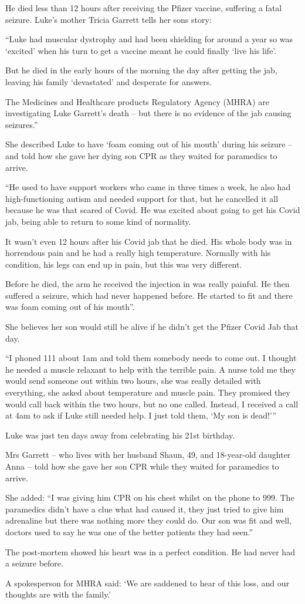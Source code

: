 He died less than 12 hours after receiving the Pfizer vaccine, suffering a fatal
seizure. Luke’s mother Tricia Garrett tells her sons story:

“Luke had muscular dystrophy and had been shielding for around a year so was
‘excited’ when his turn to get a vaccine meant he could finally ‘live his life’.

But he died in the early hours of the morning the day after getting the jab,
leaving his family ‘devastated’ and desperate for answers.

The Medicines and Healthcare products Regulatory Agency (MHRA) are investigating
Luke Garrett’s death – but there is no evidence of the jab causing seizures.”

She described Luke to have ‘foam coming out of his mouth’ during his seizure –
and told how she gave her dying son CPR as they waited for paramedics to arrive.

“He used to have support workers who came in three times a week, he also had
high-functioning autism and needed support for that, but he cancelled it all
because he was that scared of Covid. He was excited about going to get his Covid
jab, being able to return to some kind of normality.

It wasn’t even 12 hours after his Covid jab that he died. His whole body was in
horrendous pain and he had a really high temperature. Normally with his
condition, his legs can end up in pain, but this was very different.

Before he died, the arm he received the injection in was really painful. He then
suffered a seizure, which had never happened before. He started to fit and there
was foam coming out of his mouth”.

She believes her son would still be alive if he didn’t get the Pfizer Covid Jab
that day.

“I phoned 111 about 1am and told them somebody needs to come out. I thought he
needed a muscle relaxant to help with the terrible pain. A nurse told me they
would send someone out within two hours, she was really detailed with
everything, she asked about temperature and muscle pain. They promised they
would call back within the two hours, but no one called. Instead, I received a
call at 4am to ask if Luke still needed help. I just told them, ‘My son is
dead!'”

Luke was just ten days away from celebrating his 21st birthday.

Mrs Garrett – who lives with her husband Shaun, 49, and 18-year-old daughter
Anna – told how she gave her son CPR while they waited for paramedics to arrive.

She added: “I was giving him CPR on his chest whilst on the phone to 999. The
paramedics didn’t have a clue what had caused it, they just tried to give him
adrenaline but there was nothing more they could do. Our son was fit and well,
doctors used to say he was one of the better patients they had seen.”

The post-mortem showed his heart was in a perfect condition. He had never had a
seizure before.

A spokesperson for MHRA said: ‘We are saddened to hear of this loss, and our
thoughts are with the family.’


